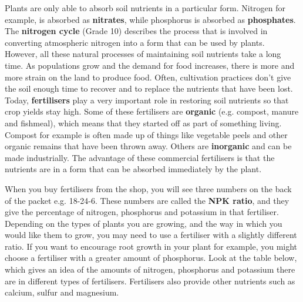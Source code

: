 Plants are only able to absorb soil nutrients in a particular form. Nitrogen for example, is absorbed as \textbf{nitrates}, while phosphorus is absorbed as \textbf{phosphates}. The \textbf{nitrogen cycle} (Grade 10) describes the process that is involved in converting atmospheric nitrogen into a form that can be used by plants. \\ 

However, all these natural processes of maintaining soil nutrients take a long time. As populations grow and the demand for food increases, there is more and more strain on the land to produce food. Often, cultivation practices don't give the soil enough time to recover and to replace the nutrients that have been lost. Today, \textbf{fertilisers} play a very important role in restoring soil nutrients so that crop yields stay high. Some of these fertilisers are \textbf{organic} (e.g. compost, manure and fishmeal), which means that they started off as part of something living. Compost for example is often made up of things like vegetable peels and other organic remains that have been thrown away. Others are \textbf{inorganic} and can be made industrially. The advantage of these commercial fertilisers is that the nutrients are in a form that can be absorbed immediately by the plant.


When you buy fertilisers from the shop, you will see three numbers on the back of the packet e.g. 18-24-6. These numbers are called the \textbf{NPK ratio}, and they give the percentage of nitrogen, phosphorus and potassium in that fertiliser. Depending on the types of plants you are growing, and the way in which you would like them to grow, you may need to use a fertiliser with a slightly different ratio. If you want to encourage root growth in your plant for example, you might choose a fertiliser with a greater amount of phosphorus. Look at the table below, which gives an idea of the amounts of nitrogen, phosphorus and potassium there are in different types of fertilisers. Fertilisers also provide other nutrients such as calcium, sulfur and magnesium. 

